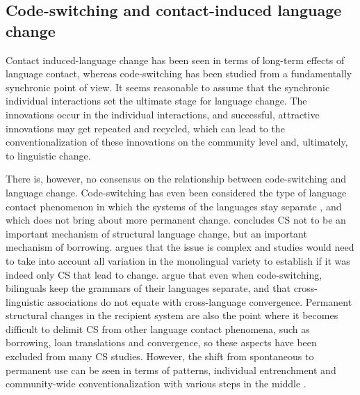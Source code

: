 \documentclass[output=paper,
modfonts
]{langscibook}
\begin{document}
\subsection{Code-switching and contact-induced language change}\label{change}

Contact induced-language change has been seen in terms of long-term effects of language contact, whereas code-switching has been studied from a fundamentally synchronic point of view. It seems reasonable to assume that the synchronic individual interactions set the ultimate stage for language change. The innovations occur in the individual interactions, and successful, attractive innovations may get repeated and recycled, which can lead to the conventionalization of these innovations on the community level and, ultimately, to linguistic change. 

There is, however, no consensus on the relationship between code-switching and language change.  Code-switching has even been considered the type of language contact phenomenon in which the systems of the languages stay separate \parencite{gardner2009code}, and which does not bring about more permanent change. \cite{thomason2001contact} concludes CS not to be an important mechanism of structural language change, but an important mechanism of borrowing. \cite{backus2005codeswitching} argues that the issue is complex and studies would need to take into account all variation in the monolingual variety to establish if it was indeed only CS that lead to change. \cite{cacoullos2018bilingualism} argue that even when code-switching, bilinguals keep the grammars of their languages separate, and that cross-linguistic associations do not equate with cross-language convergence. Permanent structural changes in the recipient system are also the point where it becomes difficult to delimit CS from other language contact phenomena, such as borrowing, loan translations and convergence, so these aspects have been excluded from many CS studies. However, the shift from spontaneous to permanent use can be seen in terms of patterns, individual entrenchment and community-wide conventionalization with various steps in the middle \parencite{backus2013usage}. 
\end{document}
